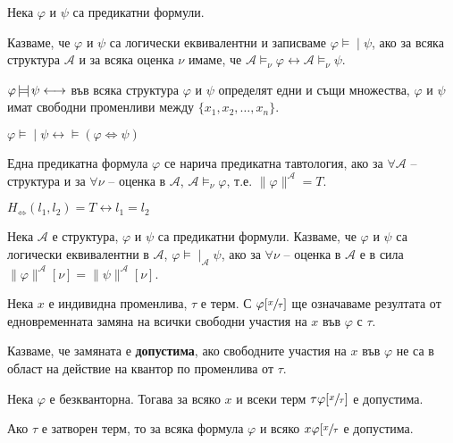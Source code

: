 \documentclass{article}
\newcommand{\mymod}{\models\!\mid}
\newcommand{\modeq}{\kern-0.15em\models\kern-0.45em|\kern+0.1em}
\begin{document}
\begin{mydef}
Нека $\varphi$ и $\psi$ са предикатни формули. 

Казваме, че $\varphi$ и $\psi$ са логически еквивалентни и записваме $\varphi \mymod \psi$, ако за всяка структура $\mathcal{A}$ и за всяка оценка $\nu$ имаме, че $\mathcal{A} \models_\nu \varphi \longleftrightarrow \mathcal{A} \models_\nu \psi$.

$\varphi \modeq \psi \longleftrightarrow$ във всяка структура $\varphi$ и $\psi$ определят едни и същи множества, $\varphi$ и $\psi$ имат свободни променливи между $\{x_1, x_2, \ldots, x_n\}$.

$\varphi \mymod \psi \longleftrightarrow \models\!(\varphi \Leftrightarrow \psi)$  
\end{mydef}

\begin{mydef}
Една предикатна формула $\varphi$ се нарича предикатна тавтология, ако за $\forall \mathcal{A}$  -- структура и за $\forall \nu$ -- оценка в $\mathcal{A}$, $\mathcal{A} \models_\nu \varphi$, т.е. $\|\varphi\|^\mathcal{A} = T$.

$H_\Leftrightarrow(l_1, l_2) = T \longleftrightarrow l_1 = l_2$
\end{mydef}

\begin{mydef}
Нека $\mathcal{A}$ е структура, $\varphi$ и $\psi$ са предикатни формули. Казваме, че $\varphi$ и $\psi$ са логически еквивалентни в $\mathcal{A}$, $\varphi \mymod_\mathcal{A} \psi$, ако за $\forall \nu$ -- оценка в $\mathcal{A}$ е в сила $\|\varphi\|^\mathcal{A}[\nu] = \|\psi\|^\mathcal{A}[\nu]$.
\end{mydef}


\begin{mydef}
Нека $x$ е индивидна променлива, $\tau$ е терм. С $\varphi[\sfrac{x}{\tau}]$ ще означаваме резултата от едновременната замяна на всички свободни участия на $x$ във $\varphi$ с $\tau$.

Казваме, че замяната е \textbf{допустима}, ако свободните участия на $x$ във $\varphi$ не са в област на действие на квантор по променлива от $\tau$.

\begin{remark}
Нека $\varphi$ е безкванторна. Тогава за всяко $x$ и всеки терм $\tau \varphi[\sfrac{x}{\tau}]$  е допустима.
\end{remark}
\begin{remark}
Ако $\tau$ е затворен терм, то за всяка формула $\varphi$ и всяко $x \varphi[\sfrac{x}{\tau}$ е допустима.
\end{remark}
\end{mydef}
\end{document}
